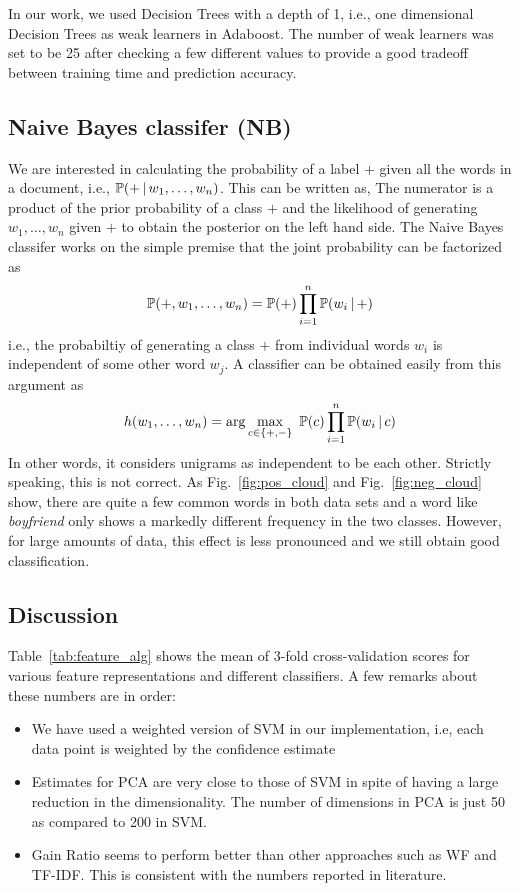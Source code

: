 \documentclass[11pt, letterpaper, conference, final, twocolumn]{ieeeconf}
\begin{document}
In our work, we used Decision Trees with a depth of 1, i.e., one dimensional Decision Trees as weak learners in Adaboost. The number of weak learners was set to be 25 after checking a few different values to provide a good tradeoff between training time and prediction accuracy.

\subsection{Naive Bayes classifer (NB)}
\label{ssec:naive_bayes}
%
We are interested in calculating the probability of a label $+$ given all the words in a document, i.e., $\mathbb{P}(+ \, \vert \, w_1, \ldots, w_n)$. This can be written as,
The numerator is a product of the prior probability of a class $+$ and the likelihood of generating $w_1, \ldots, w_n$ given $+$ to obtain the posterior on the left hand side. The Naive Bayes classifer works on the simple premise that the joint probability can be factorized as
$$
\mathbb{P}(+, w_1, \ldots, w_n) = \mathbb{P}(+) \prod_{i=1}^n \mathbb{P}(w_i \, \vert \, +)
$$
i.e., the probabiltiy of generating a class $+$ from individual words $w_i$ is independent of some other word $w_j$. A classifier can be obtained easily from this argument as
$$
h(w_1, \ldots, w_n) = \arg \max_{c \in \{ +, - \} }\ \mathbb{P}(c) \prod_{i=1}^n \mathbb{P}(w_i \, \vert \, c)
$$
%
In other words, it considers unigrams as independent to be each other. Strictly speaking, this is not correct. As Fig.~\ref{fig:pos_cloud} and Fig.~\ref{fig:neg_cloud} show, there are quite a few common words in both data sets and a word like \emph{boyfriend} only shows a markedly different frequency in the two classes. However, for large amounts of data, this effect is less pronounced and we still obtain good classification.

\subsection{Discussion}
\label{ssec:discussion}

Table~\ref{tab:feature_alg} shows the mean of $3$-fold cross-validation scores for various feature representations and different classifiers. A few remarks about these numbers are in order:

\begin{itemize}
\item We have used a weighted version of SVM in our implementation, i.e, each data point is weighted by the confidence estimate
\item Estimates for PCA are very close to those of SVM in spite of having a large reduction in the dimensionality. The number of dimensions in PCA is just 50 as compared to 200 in SVM.
\item Gain Ratio seems to perform better than other approaches such as WF and TF-IDF. This is consistent with the numbers reported in literature.
\end{itemize}
\end{document}

